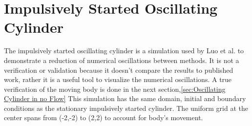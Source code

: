 \documentclass[onehalf,11pt]{beavtex}
\begin{document}
\section{Impulsively Started Oscillating Cylinder}
The impulsively started oscillating cylinder is a simulation used by Luo et al. to demonstrate a reduction of numerical oscillations between methods.
It is not a verification or validation because it doesn't compare the results to published work, rather it is a useful tool to visualize the numerical oscillations.
A true verification of the moving body is done in the next section,\ref{sec:Oscillating Cylinder in no Flow}
This simulation has the same domain, initial and boundary conditions as the stationary impulsively started cylinder.
The uniform grid at the center spans from (-2,-2) to (2,2) to account for body's movement.
\end{document}
